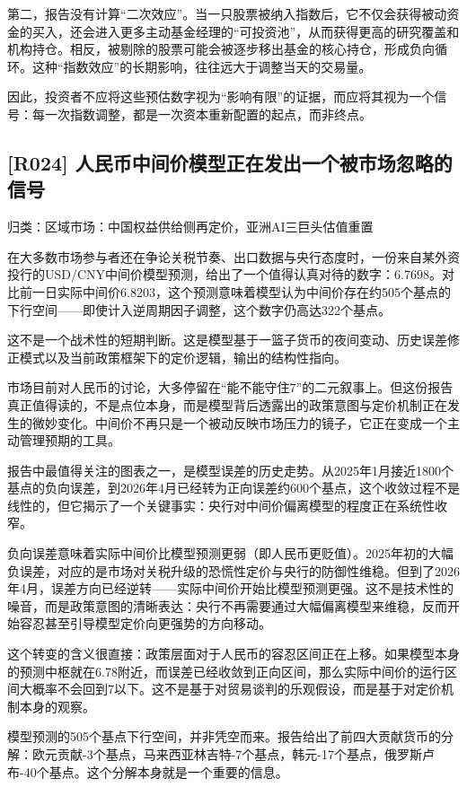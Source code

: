 \documentclass[11pt]{ctexart}
\begin{document}
第二，报告没有计算“二次效应”。当一只股票被纳入指数后，它不仅会获得被动资金的买入，还会进入更多主动基金经理的“可投资池”，从而获得更高的研究覆盖和机构持仓。相反，被剔除的股票可能会被逐步移出基金的核心持仓，形成负向循环。这种“指数效应”的长期影响，往往远大于调整当天的交易量。

因此，投资者不应将这些预估数字视为“影响有限”的证据，而应将其视为一个信号：每一次指数调整，都是一次资本重新配置的起点，而非终点。

\subsection{[R024] 人民币中间价模型正在发出一个被市场忽略的信号}
{\small\color{refgray}归类：区域市场：中国权益供给侧再定价，亚洲AI三巨头估值重置}

在大多数市场参与者还在争论关税节奏、出口数据与央行态度时，一份来自某外资投行的USD/CNY中间价模型预测，给出了一个值得认真对待的数字：6.7698。对比前一日实际中间价6.8203，这个预测意味着模型认为中间价存在约505个基点的下行空间——即使计入逆周期因子调整，这个数字仍高达322个基点。

这不是一个战术性的短期判断。这是模型基于一篮子货币的夜间变动、历史误差修正模式以及当前政策框架下的定价逻辑，输出的结构性指向。

市场目前对人民币的讨论，大多停留在“能不能守住7”的二元叙事上。但这份报告真正值得读的，不是点位本身，而是模型背后透露出的政策意图与定价机制正在发生的微妙变化。中间价不再只是一个被动反映市场压力的镜子，它正在变成一个主动管理预期的工具。

报告中最值得关注的图表之一，是模型误差的历史走势。从2025年1月接近1800个基点的负向误差，到2026年4月已经转为正向误差约600个基点，这个收敛过程不是线性的，但它揭示了一个关键事实：央行对中间价偏离模型的程度正在系统性收窄。

负向误差意味着实际中间价比模型预测更弱（即人民币更贬值）。2025年初的大幅负误差，对应的是市场对关税升级的恐慌性定价与央行的防御性维稳。但到了2026年4月，误差方向已经逆转——实际中间价开始比模型预测更强。这不是技术性的噪音，而是政策意图的清晰表达：央行不再需要通过大幅偏离模型来维稳，反而开始容忍甚至引导模型定价向更强势的方向移动。

这个转变的含义很直接：政策层面对于人民币的容忍区间正在上移。如果模型本身的预测中枢就在6.78附近，而误差已经收敛到正向区间，那么实际中间价的运行区间大概率不会回到7以下。这不是基于对贸易谈判的乐观假设，而是基于对定价机制本身的观察。

模型预测的505个基点下行空间，并非凭空而来。报告给出了前四大贡献货币的分解：欧元贡献-3个基点，马来西亚林吉特-7个基点，韩元-17个基点，俄罗斯卢布-40个基点。这个分解本身就是一个重要的信息。
\end{document}
